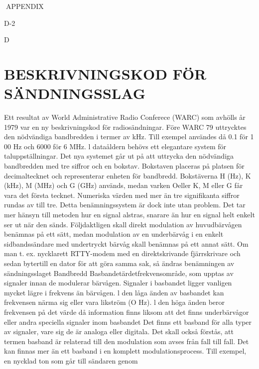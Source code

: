 \documentclass[a4paper,twoside,twocolumn,openright]{book}
\begin{document}
{{{{{{{{{{{{{APPENDIX

D-2

D

\chapter{BESKRIVNINGSKOD FÖR SÄNDNINGSSLAG}

Ett resultat av World Administrative Radio
Conferece (WARC) som avhölls år 1979 var
en ny beskrivningskod för radiosändningar.
Före WARC 79 uttrycktes den nödvändiga bandbredden i termer av kHz. Till exempel användes då 0.1 för 1 00 Hz och 6000 för
6 MHz.
l dataåldern behövs ett elegantare system för taluppställningar. Det nya systemet
går ut på att uttrycka den nödvändiga bandbredden med tre siffror och en bokstav.
Bokstaven placeras på platsen för decimaltecknet och representerar enheten för bandbredd. Bokstäverna H (Hz), K (kHz), M (MHz)
och G (GHz) används, medan varken Oeller
K, M eller G får vara det första tecknet.
Numeriska värden med mer än tre signifikanta siffror rundas av till tre.
Detta benämningssystem är dock inte
utan problem. Det tar mer hänsyn till metoden hur en signal alstras, snarare än hur en
signal helt enkelt ser ut när den sänds.
Följdaktligen skall direkt modulation av
huvudbärvågen benämnas på ett sätt, medan
modulation av en underbärvåg i en enkelt
sidbandssändare med undertryckt bärvåg
skall benämnas på ett annat sätt. Om man
t. ex. nycklarett RTTY-modem med en direktskrivande fjärrskrivare och sedan bytertill en
dator för att göra samma sak, så ändras
benämningen av sändningsslaget
Bandbredd
Basbandetärdetfrekvensområde, som upptas av signaler innan de modulerar bärvågen. Signaler i basbandet ligger vanligen
mycket lägre i frekvens än bärvågen. l den
låga änden av basbandet kan frekvensen
närma sig eller vara likström (O Hz). l den
höga änden beror frekvensen på det värde
då information finns liksom att det finns underbärvågor eller andra speciella signaler
inom basbandet Det finns ett basband för
alla typer av signaler, vare sig de är analoga
eller digitala. Det skall också förstås, att
termen basband är relaterad till den modulation som avses från fall till fall.
Det kan finnas mer än ett basband i en
komplett modulationsprocess. Till exempel,
en nycklad ton som går till sändaren genom

}}}}}}}}}}}}}
\end{document}
